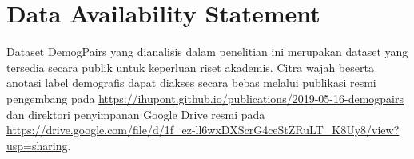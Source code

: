 \section*{Data Availability Statement}

Dataset DemogPairs yang dianalisis dalam penelitian ini merupakan dataset yang tersedia secara publik untuk keperluan riset akademis. Citra wajah beserta anotasi label demografis dapat diakses secara bebas melalui publikasi resmi pengembang pada \url{https://ihupont.github.io/publications/2019-05-16-demogpairs} dan direktori penyimpanan Google Drive resmi pada \url{https://drive.google.com/file/d/1f_ez-ll6wxDXScrG4ceStZRuLT_K8Uy8/view?usp=sharing}.

